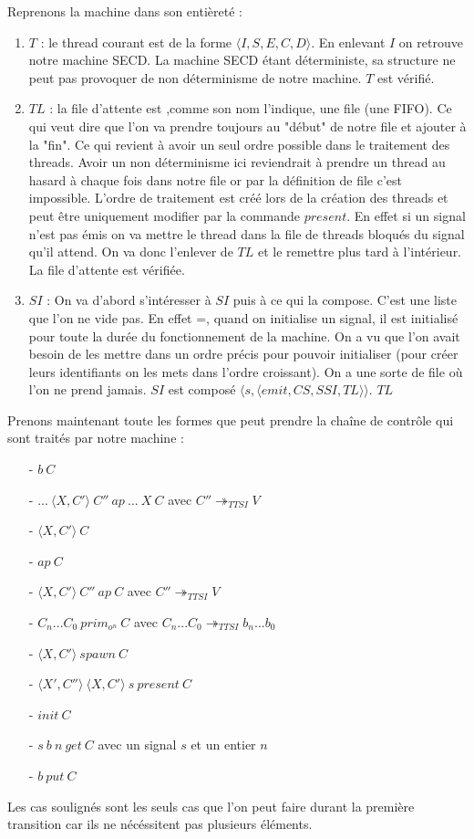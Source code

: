 \documentclass[10pt,a4paper]{report}
\begin{document}
	Reprenons la machine dans son entièreté : 
	\begin{enumerate}
		\item $T$ : le thread courant est de la forme $\langle I,S,E,C,D \rangle$. En enlevant $I$ on retrouve notre machine SECD. La machine SECD étant déterministe, sa structure ne peut pas provoquer de non déterminisme de notre machine. $T$ est vérifié.
		
		\item $TL$ : la file d'attente est ,comme son nom l'indique, une file (une FIFO). Ce qui veut dire que l'on va prendre toujours au "début" de notre file et ajouter à la "fin". Ce qui revient à avoir un seul ordre possible dans le traitement des threads. Avoir un non déterminisme ici reviendrait à prendre un thread au hasard à chaque fois dans notre file or par la définition de file c'est impossible. L'ordre de traitement est créé lors de la création des threads et peut être uniquement modifier par la commande $present$. En effet si un signal n'est pas émis on va mettre le thread dans la file de threads bloqués du signal qu'il attend. On va donc l'enlever de $TL$ et le remettre plus tard à l'intérieur. La file d'attente est vérifiée.
		
		\item $SI$ : On va d'abord s'intéresser à $SI$ puis à ce qui la compose. C'est une liste que l'on ne vide pas. En effet =, quand on initialise un signal, il est initialisé pour toute la durée  du fonctionnement de la machine. On a vu que l'on avait besoin de les mettre dans un ordre précis pour pouvoir initialiser (pour créer leurs identifiants on les mets dans l'ordre croissant). On a une sorte de file où l'on ne prend jamais. $SI$ est composé $\langle s,\langle emit,CS,SSI,TL\rangle\rangle$. $TL$ 
	\end{enumerate}
	\bigbreak
	
	Prenons maintenant toute les formes que peut prendre la chaîne de contrôle qui sont traités par notre machine :
	\begin{itemize}
		\item[-] \underline{$b~C$} 
		\item[-] $...~\langle X,C'\rangle~C''~ap~...~X~C$ avec $C'' \twoheadrightarrow_{TTSI} V$
		\item[-] \underline{$\langle X,C'\rangle~C$}
		\item[-] \underline{$ap~C$}
		\item[-] $\langle X,C'\rangle~C''~ap~C$ avec $C'' \twoheadrightarrow_{TTSI} V$
		\item[-] $C_{n}...C_{0}~prim_{o^{n}}~C$ avec $C_{n}...C_{0} \twoheadrightarrow_{TTSI} b_{n}...b_{0}$
		\item[-] $\langle X,C'\rangle~spawn~C$
		\item[-] $\langle X',C''\rangle~\langle X,C'\rangle~s~present~C$
		\item[-] \underline{$init~C$}
		\item[-] $s~b~n~get~C$ avec un signal $s$ et un entier $n$
		\item[-] $b~put~C$
	\end{itemize}
	Les cas soulignés sont les seuls cas que l'on peut faire durant la première transition car ils ne nécéssitent pas plusieurs éléments.
	\bigbreak
	
\end{document}

